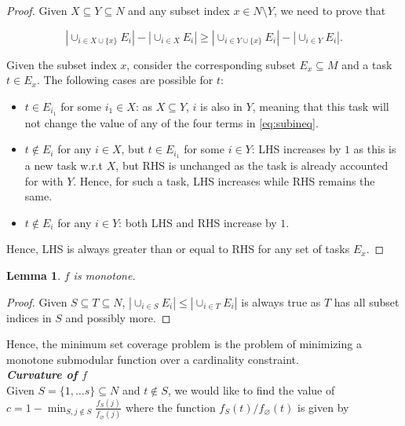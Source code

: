 \documentclass[12pt]{article}
\newcommand{\labs}{\left|}
\newcommand{\rabs}{\right|}
\newcommand{\subheading}[1]{\emph{\textbf{#1}}}
\newtheorem{lem}[thm]{Lemma}
\begin{document}
\begin{proof}
Given $X \subseteq Y \subseteq N$ and any subset index $x \in N \setminus Y$, we need to prove that

\begin{equation} \label{eq:subineq}
\labs \cup_{i \in X \cup \{x\}} E_i \rabs - \labs \cup_{i \in X} E_i \rabs \geq \labs \cup_{i \in Y \cup \{x\}} E_i \rabs - \labs \cup_{i \in Y} E_i \rabs.
\end{equation}

Given the subset index $x$, consider the corresponding subset $E_x \subseteq M$ and a task $t \in E_x$. The following cases are possible for $t$:

\begin{itemize}
\item $t \in E_{i_1}$ for some $i_1 \in X$: as $X \subseteq Y$, $i$ is also in $Y$, meaning that this task will not change the value of any of the four terms in \eqref{eq:subineq}.

\item $t \notin E_i$ for any $i \in X$, but $t \in E_{i_1}$ for some $i \in Y$: LHS increases by $1$ as this is a new task w.r.t $X$, but RHS is unchanged as the task is already accounted for with $Y$. Hence, for such a task, LHS increases while RHS remains the same.

\item $t \notin E_i$ for any $i \in Y$: both LHS and RHS increase by $1$.
\end{itemize}

Hence, LHS is always greater than or equal to RHS for any set of tasks $E_x$.
\end{proof}

\begin{lem}\label{lem:monsubmod}
$f$ is monotone.
\end{lem}

\begin{proof}
Given $S \subseteq T \subseteq N$, $\labs \cup_{i \in S} E_i \rabs \leq \labs \cup_{i \in T} E_i \rabs$ is always true as $T$ has all subset indices in $S$ and possibly more.
\end{proof}

Hence, the minimum set coverage problem is the problem of minimizing a monotone submodular function over a cardinality constraint.\\

\subheading{Curvature of $f$}\\

Given $S = \{1,\ldots s\} \subseteq N$ and $t \notin S$, we would like to find the value of $c = 1 - \min_{S,j \notin S} \frac{f_S(j)}{f_{\varnothing}(j)}$ where the function $f_S(t)/f_{\varnothing}(t)$ is given by
\end{document}
